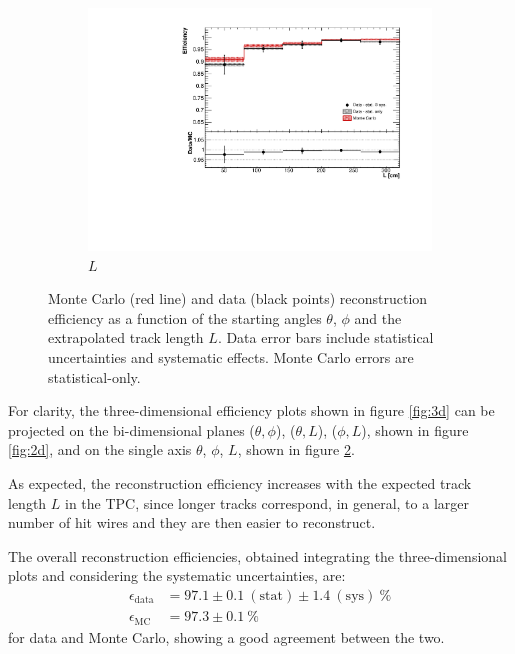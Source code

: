 \documentclass[a4paper,11pt]{article}
\begin{document}
\begin{figure}[htbp]
\begin{center}
\begin{subfigure}{0.5\textwidth}
      \includegraphics[width=\linewidth]{figures/l.pdf}
      \caption{$L$} \label{fig:l}
    \end{subfigure}
    \caption{Monte Carlo (red line) and data (black points) reconstruction efficiency as a function of the starting angles $\theta$, $\phi$ and the extrapolated track length $L$. Data error bars include statistical uncertainties and systematic effects. Monte Carlo errors are statistical-only.}\label{fig:1d}
  \end{center}
\end{figure}

For clarity, the three-dimensional efficiency plots shown in figure \ref{fig:3d} can be projected on the bi-dimensional planes ($\theta,\phi$), ($\theta,L$), ($\phi,L$), shown in figure \ref{fig:2d}, and on the single axis $\theta$, $\phi$, $L$, shown in figure \ref{fig:1d}.

As expected, the reconstruction efficiency increases with the expected track length $L$ in the TPC, since longer tracks correspond, in general, to a larger number of hit wires and they are then easier to reconstruct.


The overall reconstruction efficiencies, obtained integrating the three-dimensional plots and considering the systematic uncertainties, are:
\begin{align*}
\epsilon_{\mathrm{data}} &= 97.1 \pm 0.1~\mathrm{(stat)} \pm 1.4~\mathrm{(sys)}~\%\\
\epsilon_{\mathrm{MC}} &= 97.3 \pm 0.1~\%
\end{align*} for data and Monte Carlo, showing a good agreement between the two.
\end{document}
